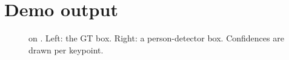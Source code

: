 \section{Demo output}\label{app:demo}

\begin{figure}[h]
  \centering
  \begin{minipage}[b]{0.28\linewidth}\centering
  \end{minipage}\hspace{6mm}
  \begin{minipage}[b]{0.28\linewidth}\centering
  \end{minipage}
  \caption[Demo with GT and detector boxes]{ on . Left: the GT box. Right: a person-detector box. Confidences are drawn per keypoint.}
  \label{fig:demo}
\end{figure}
